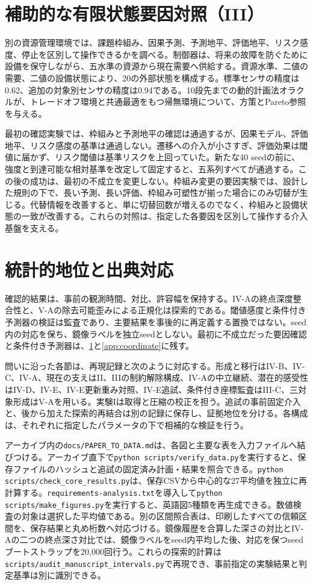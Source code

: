 \section{補助的な有限状態要因対照（III）}
\label{app:factors}
別の資源管理環境では、課題枠組み、因果予測、予測地平、評価地平、リスク感度、停止を区別して操作できるかを調べる。制御器は、将来の故障を防ぐために設備を保守しながら、五水準の資源から現在需要へ供給する。資源水準、二値の需要、二値の設備状態により、20の外部状態を構成する。標準センサの精度は0.62、追加の対象別センサの精度は0.94である。10段先までの動的計画法オラクルが、トレードオフ環境と共通最適をもつ帰無環境について、方策とPareto参照を与える。

最初の確認実験では、枠組みと予測地平の確認は通過するが、因果モデル、評価地平、リスク感度の基準は通過しない。遷移への介入が小さすぎ、評価効果は閾値に届かず、リスク閾値は基準リスクを上回っていた。新たな40 seedの前に、強度と到達可能な相対基準を改定して固定すると、五系列すべてが通過する。この後の成功は、最初の不成立を変更しない。枠組み変更の要因実験では、設計した規則の下で、長い予測、長い評価、枠組み可塑性が揃った場合にのみ切替が生じる。代替情報を改善すると、単に切替回数が増えるのでなく、枠組みと設備状態の一致が改善する。これらの対照は、指定した各要因を区別して操作する介入基盤を支える。


\section{統計的地位と出典対応}
\label{app:status}
確認的結果は、事前の観測時間、対比、許容幅を保持する。IV-Aの終点深度整合性と、V-Aの除去可能歪みによる正規化は探索的である。閾値感度と条件付き予測器の検証は監査であり、主要結果を事後的に再定義する置換ではない。seed内の対応を保ち、鏡像ラベルを独立seedとしない。最初に不成立だった要因確認と条件付き予測器は、\ref{app:factors}と\ref{app:coordinate}に残す。

問いに沿った各節は、再現記録と次のように対応する。形成と移行はIV-B、IV-C、IV-A、現在の支えはII、IIIの制約解除構成、IV-Aの中立継続、潜在的感受性はIV-D、IV-E、IV-E更新重み対照、IV-E追試、条件付き座標監査はIII-C、三対象形成はV-Aを用いる。実験Iは取得と圧縮の校正を担う。追試の事前固定介入と、後から加えた探索的再結合は別の記録に保存し、証拠地位を分ける。各構成は、それぞれに指定したパラメータの下で相補的な検証を行う。

アーカイブ内の\texttt{docs/PAPER\_TO\_DATA.md}は、各図と主要な表を入力ファイルへ結びつける。アーカイブ直下で\texttt{python scripts/verify\_data.py}を実行すると、保存ファイルのハッシュと追試の固定済み計画・結果を照合できる。\texttt{python scripts/check\_core\_results.py}は、保存CSVから中心的な27平均値を独立に再計算する。\texttt{requirements-analysis.txt}を導入して\texttt{python scripts/make\_figures.py}を実行すると、英語図5種類を再生成できる。数値検査の対象は選択した平均値である。別の区間照合表は、印刷したすべての信頼区間を、保存結果と丸め桁数へ対応づける。鏡像履歴を合算した深さの対比とIV-Aの二つの終点深さ対比では、鏡像ラベルをseed内平均した後、対応を保つseedブートストラップを20,000回行う。これらの探索的計算は\texttt{scripts/audit\_manuscript\_intervals.py}で再現でき、事前指定の実験結果と判定基準は別に識別できる。

